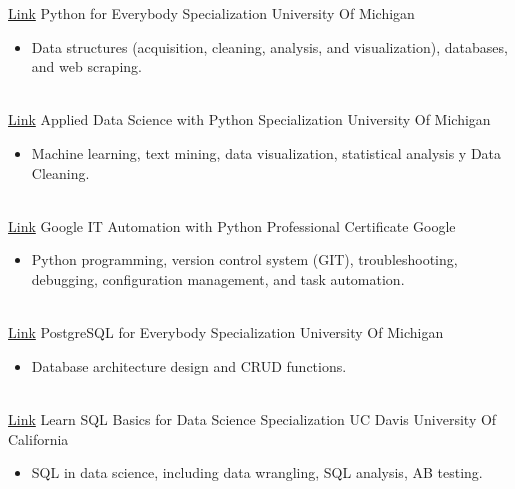 \documentclass[letterpaper]{DS_class_file} %
\begin{document}
\begin{twenty} %
	\twentyitem
	{\href{https://www.coursera.org/specializations/python?page=7}{Link}}
	{}
	{\hspace{0.1cm}Python for Everybody Specialization}
	{University Of Michigan}
	{}
	{
		{\begin{itemize}
				\item Data structures (acquisition, cleaning, analysis, and visualization), databases, and web scraping.
		\end{itemize}}
	}
	\\
	\twentyitem
	{\href{https://www.coursera.org/specializations/data-science-python}{Link}}
	{}
	{\hspace{0.1cm}Applied Data Science with Python Specialization}
	{University Of Michigan}
	{}
	{
		{\begin{itemize}
				\item Machine learning, text mining, data visualization, statistical analysis  y Data Cleaning.
		\end{itemize}}
	}
	\\
	\twentyitem
	{\href{https://www.coursera.org/professional-certificates/google-it-automation}{Link}}
	{}
	{\hspace{0.1cm}Google IT Automation with Python Professional Certificate}
	{Google }
	{}
	{
		{\begin{itemize}
				\item Python programming, version control system (GIT), troubleshooting, debugging, configuration management, and task automation. 
		\end{itemize}}
	}
	\\
	\twentyitem
	{\href{https://www.coursera.org/specializations/postgresql-for-everybody}{Link}}
	{}
	{\hspace{0.1cm}PostgreSQL for Everybody Specialization}
	{University Of Michigan}
	{}
	{
		{\begin{itemize}
				\item Database architecture design and CRUD functions.
		\end{itemize}}
	}
	\\
	\twentyitem
	{\href{https://www.coursera.org/specializations/learn-sql-basics-data-science}{Link}}
	{}
	{\hspace{0.1cm}Learn SQL Basics for Data Science Specialization}
	{UC Davis University Of California}
	{}
	{
		{\begin{itemize}
				\item SQL in data science, including data wrangling, SQL analysis, AB testing. 

\end{itemize}}}
\end{twenty}
\end{document}
